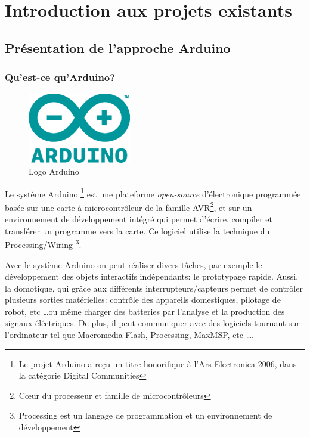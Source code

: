 \part{Introduction aux projets existants}
\chapter[Présentation de l’approche Arduino]{Présentation de l’approche Arduino}
\label{chap:chap2}

\section{Qu'est-ce qu'Arduino?}

\begin{figure}[h]
\begin{center}
\includegraphics[scale=0.4]{figure/Arduino/Arduinologo.png}
\caption{Logo Arduino}
\end{center}
\end{figure}

Le système Arduino \footnote{Le projet Arduino a reçu un titre honorifique à l'Ars Electronica 2006, dans la catégorie Digital Communities} 
est une plateforme \textit{open-source} d'électronique programmée basée sur une carte à microcontrôleur de la famille AVR\footnote{
Cœur du processeur et famille de microcontrôleurs}, et sur un environnement
de développement intégré qui permet d'écrire, compiler et transférer un programme vers la carte. Ce logiciel utilise la technique du Processing/Wiring
\footnote{Processing est un langage de programmation et un environnement de développement}.

Avec le système Arduino on peut réaliser divers tâches, par exemple le développement des objets interactifs indépendants: le prototypage rapide. Aussi,  
la domotique, qui grâce aux différents interrupteurs/capteurs permet de contrôler plusieurs sorties matérielles: contrôle des appareils domestiques, 
pilotage de robot, etc \ldots ou même charger des batteries par l'analyse et la production des signaux éléctriques. 
De plus, il peut communiquer avec des logiciels tournant sur l'ordinateur tel que Macromedia Flash, Processing, MaxMSP, etc \ldots.

